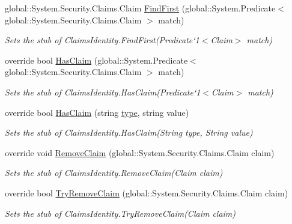 \begin{DoxyCompactItemize}
global\-::\-System.\-Security.\-Claims.\-Claim \hyperlink{class_system_1_1_security_1_1_principal_1_1_fakes_1_1_stub_generic_identity_aeaa6acb2f1295a935b6cea879fe5d056}{Find\-First} (global\-::\-System.\-Predicate$<$ global\-::\-System.\-Security.\-Claims.\-Claim $>$ match)
\begin{DoxyCompactList}\small\item\em Sets the stub of Claims\-Identity.\-Find\-First(Predicate`1$<$Claim$>$ match)\end{DoxyCompactList}\item 
override bool \hyperlink{class_system_1_1_security_1_1_principal_1_1_fakes_1_1_stub_generic_identity_acf35051421f3f637de446b8fe81a4c72}{Has\-Claim} (global\-::\-System.\-Predicate$<$ global\-::\-System.\-Security.\-Claims.\-Claim $>$ match)
\begin{DoxyCompactList}\small\item\em Sets the stub of Claims\-Identity.\-Has\-Claim(Predicate`1$<$Claim$>$ match)\end{DoxyCompactList}\item 
override bool \hyperlink{class_system_1_1_security_1_1_principal_1_1_fakes_1_1_stub_generic_identity_aff68c8d698db43f6bdd8c057c70fca0c}{Has\-Claim} (string \hyperlink{jquery-1_810_82-vsdoc_8js_a3940565e83a9bfd10d95ffd27536da91}{type}, string value)
\begin{DoxyCompactList}\small\item\em Sets the stub of Claims\-Identity.\-Has\-Claim(\-String type, String value)\end{DoxyCompactList}\item 
override void \hyperlink{class_system_1_1_security_1_1_principal_1_1_fakes_1_1_stub_generic_identity_a994ea71135f97d33926f952421dfbab3}{Remove\-Claim} (global\-::\-System.\-Security.\-Claims.\-Claim claim)
\begin{DoxyCompactList}\small\item\em Sets the stub of Claims\-Identity.\-Remove\-Claim(\-Claim claim)\end{DoxyCompactList}\item 
override bool \hyperlink{class_system_1_1_security_1_1_principal_1_1_fakes_1_1_stub_generic_identity_ab20f2b0e5533f55ce2df0a5fd5748b75}{Try\-Remove\-Claim} (global\-::\-System.\-Security.\-Claims.\-Claim claim)
\begin{DoxyCompactList}\small\item\em Sets the stub of Claims\-Identity.\-Try\-Remove\-Claim(\-Claim claim)\end{DoxyCompactList}\end{DoxyCompactItemize}
